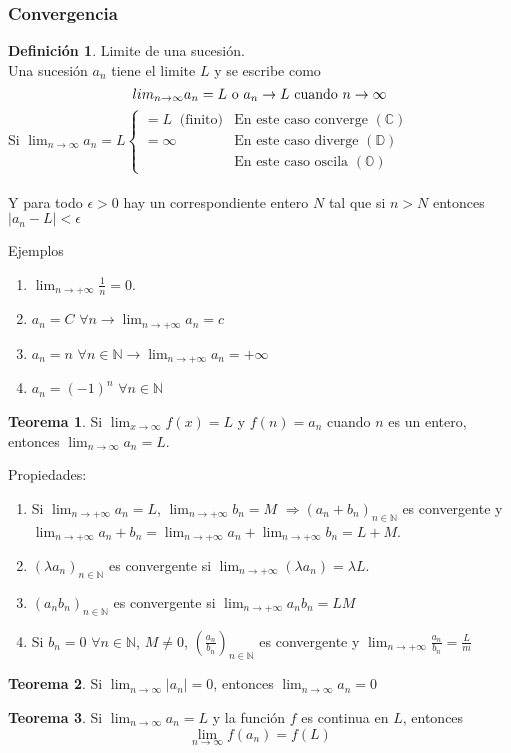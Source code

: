 \documentclass[10pt]{article}
\theoremstyle{definition}
\newtheorem{definition}{Definición}[section]
\newtheorem{theorem}{Teorema}[section]
\begin{document}
\subsubsection{Convergencia}
\begin{definition}{Limite de una sucesión.}
	\\Una sucesión $a_n$ tiene el limite $L$ y se escribe como $$\\lim_{n \to \infty} a_n = L \text{ o } a_n \to L \text{ cuando } n \to \infty$$
	Si $\lim _{n\rightarrow \infty } a_{n} =L\begin{cases}
			=L\ \text{ (finito)} & \text{En este caso converge }(\mathbb{C}) \\
			=\infty              & \text{En este caso diverge }(\mathbb{D})  \\
			                     & \text{En este caso oscila }(\mathbb{O})
		\end{cases}$\\\\
	Y para todo $\epsilon > 0$ hay un correspondiente entero $N$ tal que si $n>N$ entonces $|a_n-L|<\epsilon$
\end{definition}
Ejemplos
\begin{enumerate}
	\item $\lim_{n \to + \infty} \frac{1}{n}=0$.
	\item $a_n=C$ $\forall n \rightarrow \lim_{n \to + \infty} a_n=c$
	\item $a_n=n$ $\forall n \in \mathbb{N} \rightarrow \lim_{n \to + \infty} a_n=+\infty$
	\item $a_n=(-1)^n$ $\forall n \in \mathbb{N}$
\end{enumerate}
\begin{theorem}
	Si $\lim_{x \to \infty} f(x)=L$ y $f(n)=a_n$ cuando $n$ es un entero, entonces $\lim_{n \to \infty} a_n = L$.
\end{theorem}
Propiedades:
\begin{enumerate}
	\item Si $\lim_{n \to + \infty} a_n=L$, $\lim_{n \to + \infty} b_n=M$ $\Rightarrow (a_n+b_n)_{n \in \mathbb{N}}$ es convergente y $\lim_{n \to + \infty} a_n+b_n=\lim_{n \to + \infty}a_n+\lim_{n \to + \infty} b_n=L+M$.
	\item $(\lambda a_n)_{n \in \mathbb{N}}$ es convergente si $\lim_{n \to +\infty} (\lambda a_n)=\lambda L$.
	\item $(a_n b_n)_{n\in\mathbb{N}}$ es convergente si $\lim_{n \to +\infty} a_n b_n=LM$
	\item Si $b_n=0$ $\forall n\in\mathbb{N}$, $M \ne 0$, $(\frac{a_n}{b_n})_{n\in\mathbb{N}}$ es convergente y $\lim_{n \to + \infty} \frac{a_n}{b_n}=\frac{L}{m}$
\end{enumerate}
\begin{theorem}
	Si $\lim_{n \to \infty} |a_n|=0$, entonces $\lim_{n \to \infty} a_n=0$
\end{theorem}
\begin{theorem}
	Si $\lim_{n \to \infty} a_n = L$ y la función $f$ es continua en $L$, entonces $$\lim_{n \to \infty} f(a_n)=f(L)$$
\end{theorem}\newpage
\end{document}
